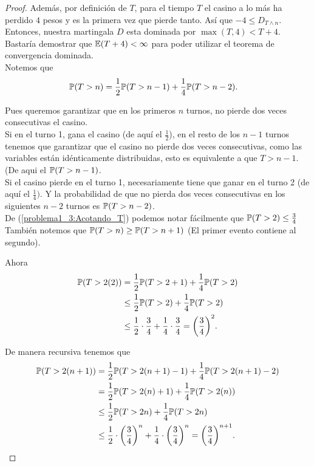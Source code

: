 \begin{proof}
		Además, por definición de $T$, para el tiempo $T$ el casino a lo más ha perdido $4$ pesos y es la primera vez que 
		pierde tanto. Así que $-4 \leq D_{T \wedge n}$.\\ 
		
		Entonces, nuestra martingala $D$ esta dominada por $\max(T, 4) < T + 4$. Bastaría demostrar que $\mathbb{E}(T+4) < \infty$ para poder
		utilizar el teorema de convergencia dominada.\\
		
		Notemos que 
		\begin{align}\label{problema1_3:Acotando_T}
			\mathbb{P}(T > n) &= \frac{1}{2} \mathbb{P}(T > n-1) + \frac{1}{4} \mathbb{P}(T > n-2). 
		\end{align}
		
		Pues queremos garantizar que en los primeros $n$ turnos, no pierde dos veces consecutivas el casino.\\
		
		Si en el turno 1, gana el casino (de aquí el $\frac{1}{2}$), en el resto de los $n-1$ turnos tenemos que garantizar que 
		el casino no pierde dos veces consecutivas, como las variables están idénticamente distribuidas, esto es equivalente a que
		$T>n-1$. (De aqui el $\mathbb{P}(T > n-1)$.\\
		
		Si el casino pierde en el turno 1, necesariamente tiene que ganar en el turno 2 (de aquí el $\frac{1}{4})$. Y la probabilidad
		de que no pierda dos veces consecutivas en los siguientes $n-2$ turnos es $\mathbb{P}(T > n-2)$.\\					    
		
		De (\ref{problema1_3:Acotando_T}) podemos notar fácilmente que $\mathbb{P}(T > 2) \leq \frac{3}{4}$\\
		
		También notemos que $\mathbb{P}(T > n ) \geq \mathbb{P}(T > n + 1)$ (El primer evento contiene al segundo).
		
		Ahora
		\begin{align}
			\mathbb{P}(T > 2 (2)) &=     \frac{1}{2} \mathbb{P}(T > 2+1) + \frac{1}{4} \mathbb{P}(T > 2) \\
						   &\leq  \frac{1}{2} \mathbb{P}(T > 2) + \frac{1}{4} \mathbb{P}(T > 2) \\
						   &\leq  \frac{1}{2} \cdot \frac{3}{4} + \frac{1}{4} \cdot \frac{3}{4} = \bigg(\frac{3}{4}\bigg)^2.
		\end{align}
		
		De manera recursiva tenemos que
		\begin{align}
			\mathbb{P}(T > 2(n+1)) &=     \frac{1}{2} \mathbb{P}(T > 2(n+1) - 1) + \frac{1}{4} \mathbb{P}(T > 2(n+1) - 2) \\
							&=     \frac{1}{2} \mathbb{P}(T > 2(n) + 1) + \frac{1}{4} \mathbb{P}(T > 2(n)) \\
						   &\leq  \frac{1}{2} \mathbb{P}(T > 2n) + \frac{1}{4} \mathbb{P}(T > 2n) \\
						   &\leq  \frac{1}{2} \cdot \bigg(\frac{3}{4}\bigg)^{n} + \frac{1}{4} \cdot \bigg(\frac{3}{4}\bigg)^{n} = 		
						   \bigg(\frac{3}{4}\bigg)^{n+1}.
		\end{align}
		

\end{proof}
